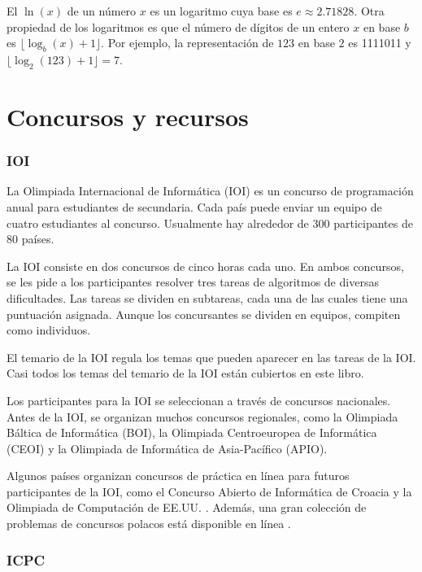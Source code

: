
El  $\ln(x)$ de un n\'umero $x$
es un logaritmo cuya base es $e \approx 2.71828$.
Otra propiedad de los logaritmos es que
el n\'umero de d\'igitos de un entero $x$ en base $b$ es
$\lfloor \log_b(x)+1 \rfloor$.
Por ejemplo, la representaci\'on de
$123$ en base $2$ es 1111011 y
$\lfloor \log_2(123)+1 \rfloor = 7$.

\section{Concursos y recursos}

\subsubsection{IOI}

La Olimpiada Internacional de Informática (IOI)
es un concurso de programación anual para
estudiantes de secundaria.
Cada país puede enviar un equipo de
cuatro estudiantes al concurso.
Usualmente hay alrededor de 300 participantes
de 80 países.

La IOI consiste en dos concursos de cinco horas cada uno.
En ambos concursos, se les pide a los participantes
resolver tres tareas de algoritmos de diversas dificultades.
Las tareas se dividen en subtareas,
cada una de las cuales tiene una puntuación asignada.
Aunque los concursantes se dividen en equipos,
compiten como individuos.

El temario de la IOI \cite{iois} regula los temas
que pueden aparecer en las tareas de la IOI.
Casi todos los temas del temario de la IOI
están cubiertos en este libro.

Los participantes para la IOI se seleccionan a través de
concursos nacionales.
Antes de la IOI, se organizan muchos concursos regionales,
como la Olimpiada Báltica de Informática (BOI),
la Olimpiada Centroeuropea de Informática (CEOI)
y la Olimpiada de Informática de Asia-Pacífico (APIO).

Algunos países organizan concursos de práctica en línea
para futuros participantes de la IOI,
como el Concurso Abierto de Informática de Croacia \cite{coci}
y la Olimpiada de Computación de EE.UU. \cite{usaco}.
Además, una gran colección de problemas de concursos polacos
está disponible en línea \cite{main}.

\subsubsection{ICPC}

